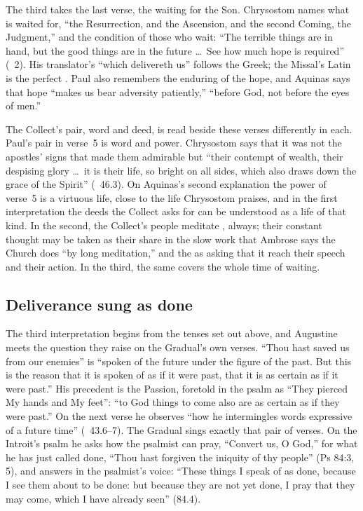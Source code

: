 The third takes the last verse, the waiting for the Son. Chrysostom names what
is waited for, ``the Resurrection, and the Ascension, and the second Coming,
the Judgment,'' and the condition of those who wait: ``The terrible things are
in hand, but the good things are in the future \dots\ See how much hope is
required'' (~2). His translator's ``which delivereth us'' follows
the Greek; the Missal's Latin is the perfect . Paul also
remembers the enduring of the hope, and Aquinas says that hope ``makes us bear adversity patiently,''
``before God, not before the eyes of men.''

The Collect's pair, word and deed, is read beside these verses differently in
each. Paul's pair in verse~5 is word and power. Chrysostom says that it was
not the apostles' signs that made them admirable but ``their contempt of
wealth, their despising glory \dots\ it is their life, so bright on all sides,
which also draws down the grace of the Spirit'' (~46.3). On
Aquinas's second explanation the power of verse~5 is a virtuous life, close
to the life Chrysostom praises, and in the first interpretation the deeds the
Collect asks for can be understood as a life of that kind. In the second, the Collect's people meditate
, always; their constant thought may be taken as their share in
the slow work that Ambrose says the Church does ``by long meditation,'' and the
 as asking that it reach their speech and their action. In
the third, the same  covers the whole time of waiting.

\subsection{Deliverance sung as done}

The third interpretation begins from the tenses set out above, and Augustine
meets the question they raise on the Gradual's own verses. ``Thou
hast saved us from our enemies'' is ``spoken of the future under the figure of
the past. But this is the reason that it is spoken of as if it were past, that
it is as certain as if it were past.'' His precedent is the Passion, foretold
in the psalm as ``They pierced My hands and My feet'': ``to God things to come
also are as certain as if they were past.'' On the next verse he observes
``how he intermingles words expressive of a future time'' (~43.6--7). The Gradual sings exactly that pair of verses. On the Introit's
psalm he asks how the psalmist can pray, ``Convert us, O God,'' for what he
has just called done, ``Thou hast forgiven the iniquity of thy people'' (Ps
84:3, 5), and answers in the psalmist's voice: ``These things I speak of as
done, because I see them about to be done: but because they are not yet done,
I pray that they may come, which I have already seen'' (84.4).

